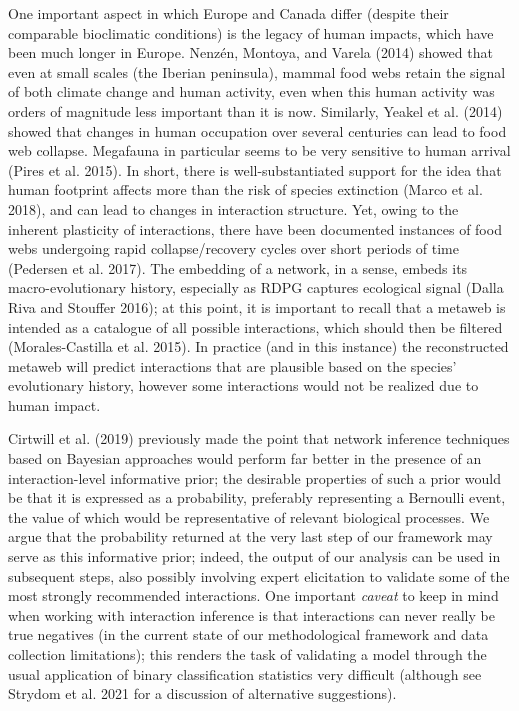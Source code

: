 \documentclass[10pt,oneside]{article}
\begin{document}
One important aspect in which Europe and Canada differ (despite their
comparable bioclimatic conditions) is the legacy of human impacts, which
have been much longer in Europe. Nenzén, Montoya, and Varela (2014)
showed that even at small scales (the Iberian peninsula), mammal food
webs retain the signal of both climate change and human activity, even
when this human activity was orders of magnitude less important than it
is now. Similarly, Yeakel et al. (2014) showed that changes in human
occupation over several centuries can lead to food web collapse.
Megafauna in particular seems to be very sensitive to human arrival
(Pires et al. 2015). In short, there is well-substantiated support for
the idea that human footprint affects more than the risk of species
extinction (Marco et al. 2018), and can lead to changes in interaction
structure. Yet, owing to the inherent plasticity of interactions, there
have been documented instances of food webs undergoing rapid
collapse/recovery cycles over short periods of time (Pedersen et al.
2017). The embedding of a network, in a sense, embeds its
macro-evolutionary history, especially as RDPG captures ecological
signal (Dalla Riva and Stouffer 2016); at this point, it is important to
recall that a metaweb is intended as a catalogue of all possible
interactions, which should then be filtered (Morales-Castilla et al.
2015). In practice (and in this instance) the reconstructed metaweb will
predict interactions that are plausible based on the species'
evolutionary history, however some interactions would not be realized
due to human impact.

Cirtwill et al. (2019) previously made the point that network inference
techniques based on Bayesian approaches would perform far better in the
presence of an interaction-level informative prior; the desirable
properties of such a prior would be that it is expressed as a
probability, preferably representing a Bernoulli event, the value of
which would be representative of relevant biological processes. We argue
that the probability returned at the very last step of our framework may
serve as this informative prior; indeed, the output of our analysis can
be used in subsequent steps, also possibly involving expert elicitation
to validate some of the most strongly recommended interactions. One
important \emph{caveat} to keep in mind when working with interaction
inference is that interactions can never really be true negatives (in
the current state of our methodological framework and data collection
limitations); this renders the task of validating a model through the
usual application of binary classification statistics very difficult
(although see Strydom et al. 2021 for a discussion of alternative
suggestions).
\end{document}
